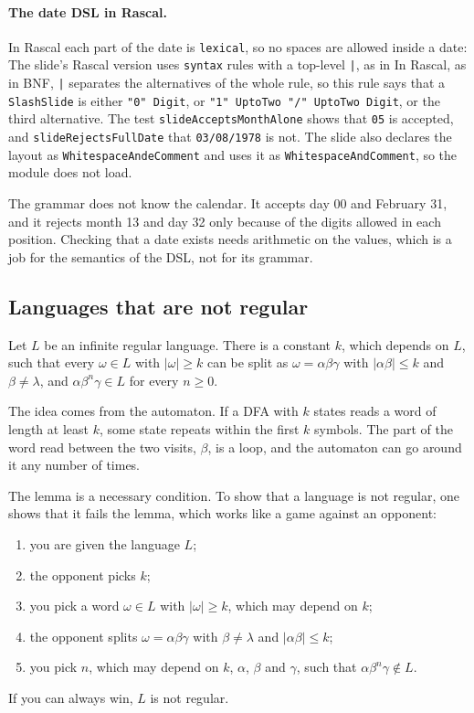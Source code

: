 \paragraph{The date DSL in Rascal.} In Rascal each part of the date is
\texttt{lexical}, so no spaces are allowed inside a date:
The slide's Rascal version uses \texttt{syntax} rules with a top-level
\texttt{|}, as in
In Rascal, as in BNF, \texttt{|} separates the alternatives of the whole rule,
so this rule says that a \texttt{SlashSlide} is either \texttt{"0" Digit}, or
\texttt{"1" UptoTwo "/" UptoTwo Digit}, or the third alternative. The test
\texttt{slideAcceptsMonthAlone} shows that \texttt{05} is accepted, and
\texttt{slideRejectsFullDate} that \texttt{03/08/1978} is not. The slide also
declares the layout as \texttt{WhitespaceAndeComment} and uses it as
\texttt{WhitespaceAndComment}, so the module does not load.

The grammar does not know the calendar. It accepts day 00 and February 31,
and it rejects month 13 and day 32 only because of the digits allowed in each
position. Checking that a date exists needs arithmetic on the values, which is
a job for the semantics of the DSL, not for its grammar.

\subsection{Languages that are not regular}

\begin{lemma}
Let $L$ be an infinite regular language. There is a constant $k$, which
depends on $L$, such that every $\omega \in L$ with $|\omega| \ge k$ can be split
as $\omega = \alpha\beta\gamma$ with $|\alpha\beta| \le k$ and $\beta \ne \lambda$, and
$\alpha\beta^n\gamma \in L$ for every $n \ge 0$.
\end{lemma}

The idea comes from the automaton. If a DFA with $k$ states reads a word of
length at least $k$, some state repeats within the first $k$ symbols. The
part of the word read between the two visits, $\beta$, is a loop, and the
automaton can go around it any number of times.

The lemma is a necessary condition. To show that a language is not regular,
one shows that it fails the lemma, which works like a game against an
opponent:
\begin{enumerate}
  \item you are given the language $L$;
  \item the opponent picks $k$;
  \item you pick a word $\omega \in L$ with $|\omega| \ge k$, which may depend on $k$;
  \item the opponent splits $\omega = \alpha\beta\gamma$ with $\beta \ne \lambda$ and
    $|\alpha\beta| \le k$;
  \item you pick $n$, which may depend on $k$, $\alpha$, $\beta$ and $\gamma$, such that
    $\alpha\beta^n\gamma \notin L$.
\end{enumerate}
If you can always win, $L$ is not regular.

